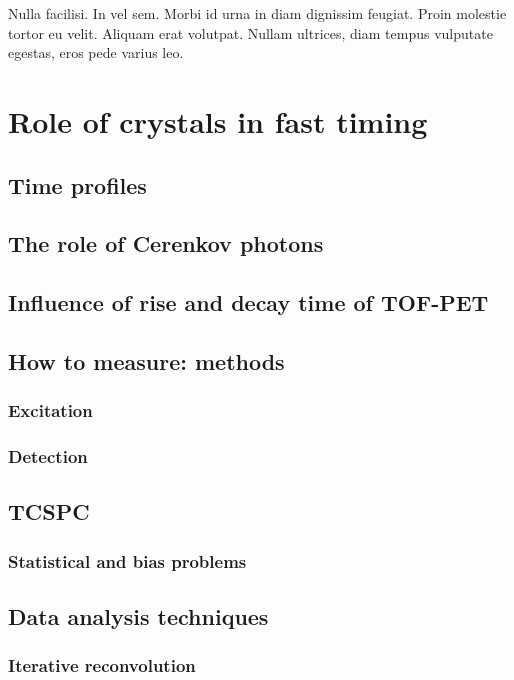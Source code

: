 \begin{savequote}[75mm] 
Nulla facilisi. In vel sem. Morbi id urna in diam dignissim feugiat. Proin molestie tortor eu velit. Aliquam erat volutpat. Nullam ultrices, diam tempus vulputate egestas, eros pede varius leo.
\end{savequote}

\chapter{Role of crystals in fast timing}

\section{Time profiles}

\section{The role of Cerenkov photons}

\section{Influence of rise and decay time of TOF-PET}

\section{How to measure: methods}

\subsection{Excitation}
\subsection{Detection}

\section{TCSPC}

\subsection{Statistical and bias problems}

\section{Data analysis techniques}
\subsection{Iterative reconvolution}